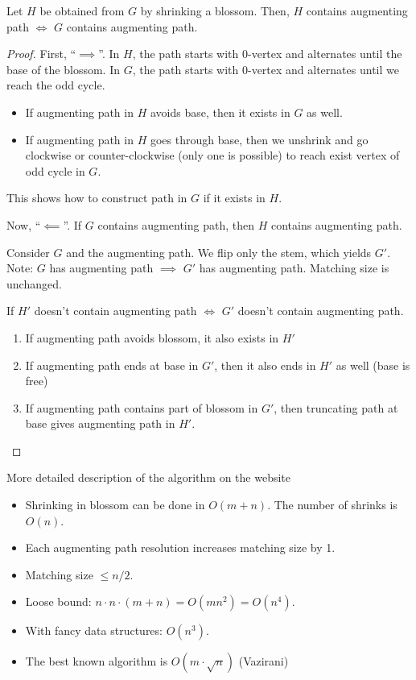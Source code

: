 \begin{mytheorem}
Let $H$ be obtained from $G$ by shrinking a blossom. Then, $H$ contains augmenting path $\iff$ $G$ contains augmenting path.
\end{mytheorem}
\begin{proof}
First, ``$\implies$''. In $H$, the path starts with 0-vertex and alternates until the base of the blossom. In $G$, the path starts with 0-vertex and alternates until we reach the odd cycle.

\begin{itemize}
\item If augmenting path in $H$ avoids base, then it exists in $G$ as well.
\item If augmenting path in $H$ goes through base, then we unshrink and go clockwise or counter-clockwise (only one is possible) to reach exist vertex of odd cycle in $G$. 
\end{itemize}

This shows how to construct path in $G$ if it exists in $H$.

Now, ``$\impliedby$''. If $G$ contains augmenting path, then $H$ contains augmenting path.

Consider $G$ and the augmenting path. We flip only the stem, which yields $G'$.
Note: $G$ has augmenting path $\implies$ $G'$ has augmenting path. Matching size is unchanged.

If $H'$ doesn't contain augmenting path $\iff$ $G'$ doesn't contain augmenting path.

\begin{enumerate}
\item If augmenting path avoids blossom, it also exists in $H'$
\item If augmenting path ends at base in $G'$, then it also ends in $H'$ as well (base is free)
\item If augmenting path contains part of blossom in $G'$, then truncating path at base gives augmenting path in $H'$.
\end{enumerate}
\end{proof}

More detailed description of the algorithm on the website

\begin{itemize}
\item Shrinking in blossom can be done in $O(m + n)$. The number of shrinks is $O(n)$.
\item Each augmenting path resolution increases matching size by 1.
\item Matching size $\le n/2$.
\item Loose bound: $n \cdot n \cdot (m + n) = O(m n^2) = O(n^4)$.
\item With fancy data structures: $O(n^3)$.
\item The best known algorithm is $O(m \cdot \sqrt{n})$ (Vazirani)
\end{itemize}


